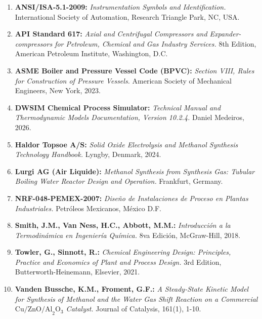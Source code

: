 \documentclass[10pt,letterpaper]{article}
\begin{document}
\begin{enumerate}[leftmargin=*,itemsep=4pt]
    \item \textbf{ANSI/ISA-5.1-2009:} \textit{Instrumentation Symbols and Identification.} International Society of Automation, Research Triangle Park, NC, USA.
    \item \textbf{API Standard 617:} \textit{Axial and Centrifugal Compressors and Expander-compressors for Petroleum, Chemical and Gas Industry Services.} 8th Edition, American Petroleum Institute, Washington, D.C.
    \item \textbf{ASME Boiler and Pressure Vessel Code (BPVC):} \textit{Section VIII, Rules for Construction of Pressure Vessels.} American Society of Mechanical Engineers, New York, 2023.
    \item \textbf{DWSIM Chemical Process Simulator:} \textit{Technical Manual and Thermodynamic Models Documentation, Version 10.2.4.} Daniel Medeiros, 2026.
    \item \textbf{Haldor Topsoe A/S:} \textit{Solid Oxide Electrolysis and Methanol Synthesis Technology Handbook.} Lyngby, Denmark, 2024.
    \item \textbf{Lurgi AG (Air Liquide):} \textit{Methanol Synthesis from Synthesis Gas: Tubular Boiling Water Reactor Design and Operation.} Frankfurt, Germany.
    \item \textbf{NRF-048-PEMEX-2007:} \textit{Diseño de Instalaciones de Proceso en Plantas Industriales.} Petróleos Mexicanos, México D.F.
    \item \textbf{Smith, J.M., Van Ness, H.C., Abbott, M.M.:} \textit{Introducción a la Termodinámica en Ingeniería Química.} 8va Edición, McGraw-Hill, 2018.
    \item \textbf{Towler, G., Sinnott, R.:} \textit{Chemical Engineering Design: Principles, Practice and Economics of Plant and Process Design.} 3rd Edition, Butterworth-Heinemann, Elsevier, 2021.
    \item \textbf{Vanden Bussche, K.M., Froment, G.F.:} \textit{A Steady-State Kinetic Model for Synthesis of Methanol and the Water Gas Shift Reaction on a Commercial $\text{Cu/ZnO/Al}_2\text{O}_3$ Catalyst.} Journal of Catalysis, 161(1), 1-10.
\end{enumerate}
\end{document}
